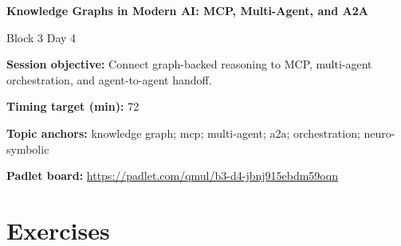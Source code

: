 \documentclass[11pt]{article}
\begin{document}
\begin{center}\LARGE\bfseries Knowledge Graphs in Modern AI: MCP, Multi-Agent, and A2A\end{center}

\begin{center}\large Block 3 Day 4\end{center}

\begin{tcolorbox}[colback=MidnightBlue!4,colframe=MidnightBlue,title={Session Overview},fonttitle=\bfseries,breakable]
\textbf{Session objective:} Connect graph-backed reasoning to MCP, multi-agent orchestration, and agent-to-agent handoff.

\textbf{Timing target (min):} 72

\textbf{Topic anchors:} knowledge graph; mcp; multi-agent; a2a; orchestration; neuro-symbolic

\textbf{Padlet board:} \url{https://padlet.com/qmul/b3-d4-jbnj915ebdm59oqn}
\end{tcolorbox}

\section*{Exercises}
\end{document}
